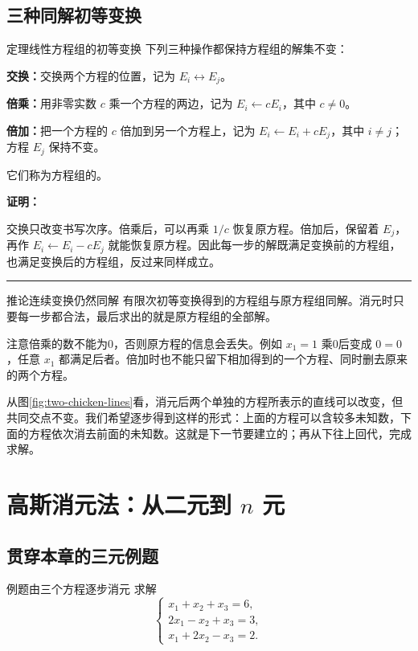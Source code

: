 \documentclass[a4paper,12pt,twoside,openany,fontset=none]{ctexbook}
\newcounter{theorem}[chapter]
\newenvironment{theorem}[1][]{\begin{thmBox}{定理}{#1}}{\end{thmBox}}
\newenvironment{corollary}[1][]{\begin{thmBox}{推论}{#1}}{\end{thmBox}}
\newcounter{example}[chapter]
\newenvironment{example}[1][]{\begin{exBox}{例题}{#1}}{\end{exBox}}
\renewenvironment{proof}{
    \par\vspace{0.5em}\noindent
    \textbf{\color{LogicColor} 证明：}
}{
    \hfill \textcolor{LogicColor}{\rule{0.6em}{0.6em}} \par
}
\numberwithin{equation}{chapter}
\begin{document}
\subsection*{三种同解初等变换}

\begin{theorem}[线性方程组的初等变换]
下列三种操作都保持方程组的解集不变：

\textbf{交换：}交换两个方程的位置，记为 $E_i\leftrightarrow E_j$。

\textbf{倍乘：}用非零实数 $c$ 乘一个方程的两边，记为 $E_i\leftarrow cE_i$，其中 $c\ne0$。

\textbf{倍加：}把一个方程的 $c$ 倍加到另一个方程上，记为 $E_i\leftarrow E_i+cE_j$，其中 $i\ne j$；方程 $E_j$ 保持不变。

它们称为方程组的\textbf{}。
\end{theorem}

\begin{proof}
交换只改变书写次序。倍乘后，可以再乘 $1/c$ 恢复原方程。倍加后，保留着 $E_j$，再作 $E_i\leftarrow E_i-cE_j$ 就能恢复原方程。因此每一步的解既满足变换前的方程组，也满足变换后的方程组，反过来同样成立。
\end{proof}

\begin{corollary}[连续变换仍然同解]
有限次初等变换得到的方程组与原方程组同解。消元时只要每一步都合法，最后求出的就是原方程组的全部解。
\end{corollary}

注意倍乘的数不能为0，否则原方程的信息会丢失。例如 $x_1=1$ 乘0后变成 $0=0$，任意 $x_1$ 都满足后者。倍加时也不能只留下相加得到的一个方程、同时删去原来的两个方程。

从图\ref{fig:two-chicken-lines}看，消元后两个单独的方程所表示的直线可以改变，但共同交点不变。我们希望逐步得到这样的形式：上面的方程可以含较多未知数，下面的方程依次消去前面的未知数。这就是下一节要建立的\textbf{}；再从下往上回代，完成求解。

\section{高斯消元法：从二元到 $n$ 元}
\label{sec:two-gauss}

\subsection*{贯穿本章的三元例题}

\begin{example}[由三个方程逐步消元]
求解
\begin{equation}
\label{eq:two-main-system}
    \begin{cases}
        x_1+x_2+x_3=6,\\
        2x_1-x_2+x_3=3,\\
        x_1+2x_2-x_3=2.
    \end{cases}
\end{equation}
\end{example}
\end{document}
